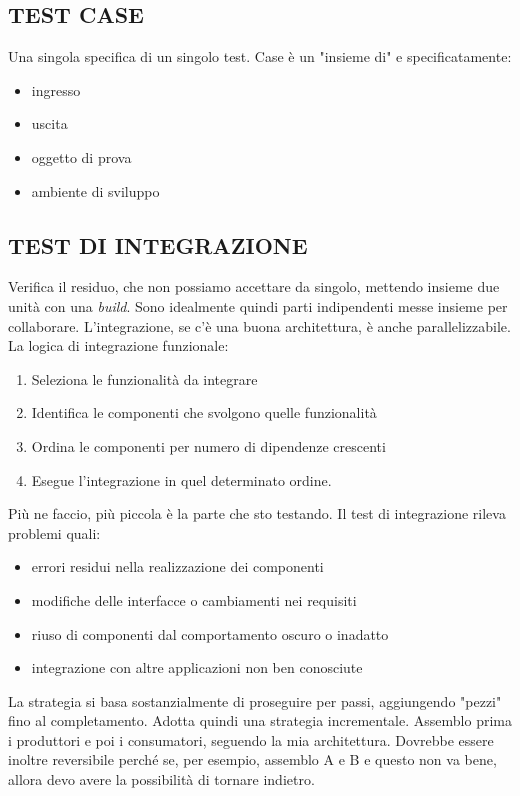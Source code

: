 		\subsection{TEST CASE}		\label{testcase}
		Una singola specifica di un singolo test. Case è un "insieme di" e specificatamente:
		\begin{itemize}
			\item ingresso
			\item uscita
			\item oggetto di prova
			\item ambiente di sviluppo
		\end{itemize}


		\subsection{TEST DI INTEGRAZIONE}	 \label{testintegrazione}
		Verifica il residuo, che non possiamo accettare da singolo, mettendo insieme due unità con una \textit{build}. Sono idealmente quindi parti indipendenti messe insieme per collaborare. L'integrazione, se c'è una buona architettura, è anche parallelizzabile. \\
		La logica di integrazione funzionale:
		\begin{enumerate}
			\item Seleziona le funzionalità da integrare
			\item Identifica le componenti che svolgono quelle funzionalità
			\item Ordina le componenti per numero di dipendenze crescenti
			\item Esegue l'integrazione in quel determinato ordine.
		\end{enumerate}
		Più ne faccio, più piccola è la parte che sto testando. Il test di integrazione rileva problemi quali:
		\begin{itemize}
			\item errori residui nella realizzazione dei componenti
			\item modifiche delle interfacce o cambiamenti nei requisiti
			\item riuso di componenti dal comportamento oscuro o inadatto
			\item integrazione con altre applicazioni non ben conosciute
		\end{itemize}
		La strategia si basa sostanzialmente di proseguire per passi, aggiungendo "pezzi" fino al completamento. Adotta quindi una strategia incrementale. Assemblo prima i produttori e poi i consumatori, seguendo la mia architettura. Dovrebbe essere inoltre reversibile perché se, per esempio, assemblo A e B e questo non va bene, allora devo avere la possibilità di tornare indietro.
